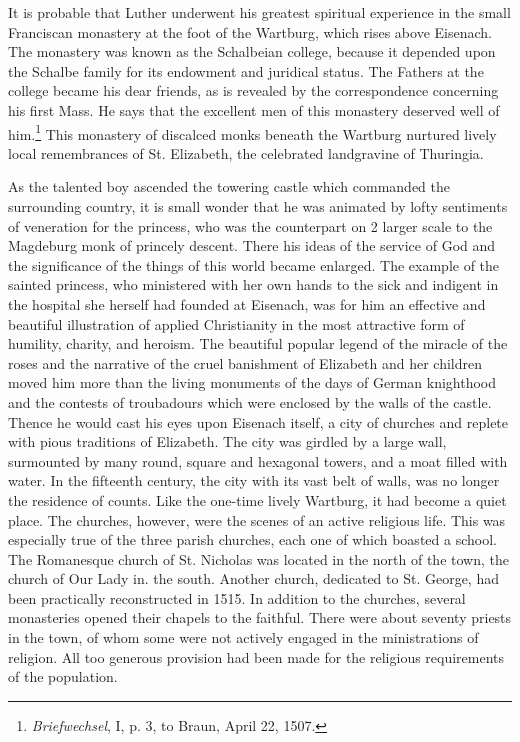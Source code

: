 It is probable that Luther underwent his greatest spiritual experience in the small Franciscan monastery at the foot of the Wartburg,
which rises above Eisenach. The monastery was known as the Schalbeian college, because it depended upon the Schalbe family for its endowment and juridical status. The Fathers at the college became his
dear friends, as is revealed by the correspondence concerning his first
Mass. He says that the excellent men of this monastery deserved well
of him.\footnote{\textit{Briefwechsel}, I, p. 3, to Braun, April 22, 1507.}
This monastery of discalced monks beneath the Wartburg
nurtured lively local remembrances of St. Elizabeth, the celebrated
landgravine of Thuringia.

As the talented boy ascended the towering castle which commanded
the surrounding country, it is small wonder that he was animated by
lofty sentiments of veneration for the princess, who was the counterpart on 2 larger scale to the Magdeburg monk of princely descent.
There his ideas of the service of God and the significance of the things
of this world became enlarged. The example of the sainted princess,
who ministered with her own hands to the sick and indigent in the
hospital she herself had founded at Eisenach, was for him an effective
and beautiful illustration of applied Christianity in the most attractive form of humility, charity, and heroism. The beautiful popular
legend of the miracle of the roses and the narrative of the cruel banishment of Elizabeth and her children moved him more than the living
monuments of the days of German knighthood and the contests of
troubadours which were enclosed by the walls of the castle. Thence
he would cast his eyes upon Eisenach itself, a city of churches and replete with pious traditions of Elizabeth. The city was girdled by a
large wall, surmounted by many round, square and hexagonal towers,
and a moat filled with water. In the fifteenth century, the city with
its vast belt of walls, was no longer the residence of counts. Like the
one-time lively Wartburg, it had become a quiet place. The churches,
however, were the scenes of an active religious life. This was especially
true of the three parish churches, each one of which boasted a school.
The Romanesque church of St. Nicholas was located in the north of
the town, the church of Our Lady in. the south. Another church,
dedicated to St. George, had been practically reconstructed in 1515.
In addition to the churches, several monasteries opened their chapels
to the faithful. There were about seventy priests in the town, of whom
some were not actively engaged in the ministrations of religion. All
too generous provision had been made for the religious requirements
of the population.

